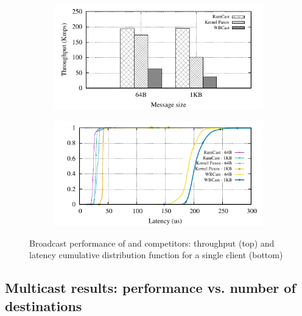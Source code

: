 \begin{figure}[htp!]
  \begin{subfigure}{\columnwidth}
    \centering
    \includegraphics[width=0.99\columnwidth]{figures/benchmark/graphs/figure-compare-single-group-throughput}
  \end{subfigure}
  \begin{subfigure}{\columnwidth}
    \centering
    \includegraphics[width=0.95\columnwidth]{figures/benchmark/graphs/figure-compare-single-group-latency-cdf}
  \end{subfigure}
  \caption{Broadcast performance of \libname and competitors: throughput (top) and latency cumulative distribution function for a single client (bottom)}
  \label{fig:broadcast}
\end{figure}


\subsection{Multicast results: performance vs. number of destinations}
\label{sec:evaluation:multicast}

